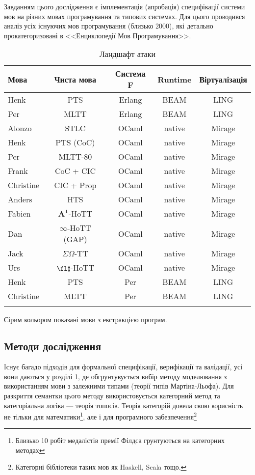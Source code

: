 Завданням цього дослідження є імплементація (апробація)
специфікації системи мов на різних мовах програмування та типових системах.
Для цього проводився аналіз усіх існуючих мов
програмування (близько 2000), які детально прокатегоризовані
в <<Енциклопедії Мов Програмування>>.

\begin{table}[ht]
 \caption{Ландшафт атаки}
  \begin{tabular}{lcccc}
   \hline
\rowcolor{ZimaBlue}
       \textbf{Мова} & \textbf{Чиста мова} & \textbf{Система F} & \textbf{Runtime} & \textbf{Віртуалізація} \\
   \hline
 Henk              & PTS         & Erlang  & BEAM   & LING \\
 Per               & MLTT      & Erlang  & BEAM   & LING \\
   \hline
 Alonzo            & STLC       & OCaml   & native & Mirage \\
 Henk              & PTS (CoC)  & OCaml   & native & Mirage \\
 Per               & MLTT-80    & OCaml   & native & Mirage \\
 Frank             & CoC + CIC  & OCaml   & native & Mirage \\
 Christine         & CIC + Prop & OCaml   & native & Mirage \\
 Anders            & HTS        & OCaml   & native & Mirage \\
 Fabien            & $\mathbf{A^1}$-HoTT       & OCaml   & native & Mirage \\
 Dan               & $\infty$-HoTT (GAP) & OCaml   & native & Mirage \\
 Jack              & $\Sigma\Omega$-TT       & OCaml   & native & Mirage \\
 Urs               & $\fl\sharp$-HoTT   & OCaml   & native & Mirage \\
   \hline
    \rowcolor{LightGray}
 Henk              & PTS        & Per     & BEAM   & LING \\
    \rowcolor{LightGray}
 Christine         & MLTT       & Per     & BEAM   & LING \\
    \rowcolor{LightGray}
    \hline
  \end{tabular}
  \small Сірим кольором показані мови з екстракцією програм.
\end{table}

\newpage
\subsection{Методи дослідження}
Існує багадо підходів для формальної специфікації,
верифікації та валідації, усі вони даються у розділі 1, де
обгрунтувується вибір методу моделювання з використанням
мови з залежними типами (теорії типів Мартіна-Льофа).
Для разкриття семантки цього методу використовується
категорний метод та категоріальна логіка --- теорія топосів.
Теорія категорій довела свою корисність не тільки для
математики\footnote{Близько 10 робіт медалістів премії
Філдса грунтуються на категорних методах},
але і для програмного
забезпечення\footnote{Категорні бібліотеки таких мов як Haskell, Scala тощо.}

